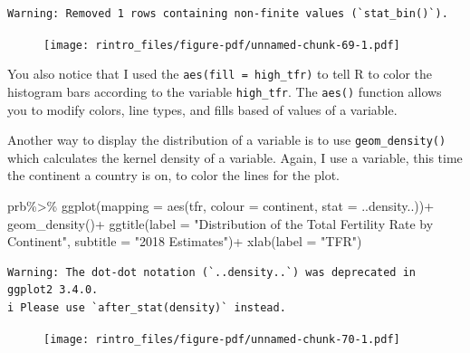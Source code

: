 \documentclass[
  letterpaper,
  DIV=11,
  numbers=noendperiod]{scrreprt}
\newenvironment{Shaded}{\begin{snugshade}}{\end{snugshade}}
\newcommand{\AttributeTok}[1]{\textcolor[rgb]{0.40,0.45,0.13}{#1}}
\newcommand{\FunctionTok}[1]{\textcolor[rgb]{0.28,0.35,0.67}{#1}}
\newcommand{\NormalTok}[1]{\textcolor[rgb]{0.00,0.23,0.31}{#1}}
\newcommand{\SpecialCharTok}[1]{\textcolor[rgb]{0.37,0.37,0.37}{#1}}
\newcommand{\StringTok}[1]{\textcolor[rgb]{0.13,0.47,0.30}{#1}}
\begin{document}
\begin{verbatim}
Warning: Removed 1 rows containing non-finite values (`stat_bin()`).
\end{verbatim}

\begin{figure}[H]

{\centering \texttt{[image: rintro\_files/figure-pdf/unnamed-chunk-69-1.pdf]}

}

\end{figure}

You also notice that I used the \texttt{aes(fill\ =\ high\_tfr)} to tell
R to color the histogram bars according to the variable
\texttt{high\_tfr}. The \texttt{aes()} function allows you to modify
colors, line types, and fills based of values of a variable.

Another way to display the distribution of a variable is to use
\texttt{geom\_density()} which calculates the kernel density of a
variable. Again, I use a variable, this time the continent a country is
on, to color the lines for the plot.

\begin{Shaded}
\begin{Highlighting}[]
\NormalTok{prb}\SpecialCharTok{\%\textgreater{}\%}
\FunctionTok{ggplot}\NormalTok{(}\AttributeTok{mapping =} \FunctionTok{aes}\NormalTok{(tfr,}
                     \AttributeTok{colour =}\NormalTok{ continent,}
                     \AttributeTok{stat =}\NormalTok{ ..density..))}\SpecialCharTok{+}
  \FunctionTok{geom\_density}\NormalTok{()}\SpecialCharTok{+}
  \FunctionTok{ggtitle}\NormalTok{(}\AttributeTok{label =} \StringTok{"Distribution of the Total Fertility Rate by Continent"}\NormalTok{,}
          \AttributeTok{subtitle =} \StringTok{"2018 Estimates"}\NormalTok{)}\SpecialCharTok{+}
  \FunctionTok{xlab}\NormalTok{(}\AttributeTok{label =} \StringTok{"TFR"}\NormalTok{)}
\end{Highlighting}
\end{Shaded}

\begin{verbatim}
Warning: The dot-dot notation (`..density..`) was deprecated in ggplot2 3.4.0.
i Please use `after_stat(density)` instead.
\end{verbatim}

\begin{figure}[H]

{\centering \texttt{[image: rintro\_files/figure-pdf/unnamed-chunk-70-1.pdf]}

}

\end{figure}
\end{document}
